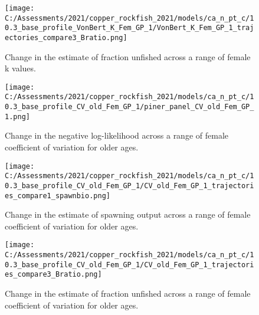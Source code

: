 \documentclass[11pt,
  english,
  a4paper,
]{article}
\begin{document}
\tagmcend\tagstructend


\begin{figure}
\centering
\texttt{[image: C:/Assessments/2021/copper\_rockfish\_2021/models/ca\_n\_pt\_c/10.3\_base\_profile\_VonBert\_K\_Fem\_GP\_1/VonBert\_K\_Fem\_GP\_1\_trajectories\_compare3\_Bratio.png]}
\caption{Change in the estimate of fraction unfished across a range of female k values.\label{fig:k-depl}}
\end{figure}

\tagmcend\tagstructend


\begin{figure}
\centering
\texttt{[image: C:/Assessments/2021/copper\_rockfish\_2021/models/ca\_n\_pt\_c/10.3\_base\_profile\_CV\_old\_Fem\_GP\_1/piner\_panel\_CV\_old\_Fem\_GP\_1.png]}
\caption{Change in the negative log-likelihood across a range of female coefficient of variation for older ages.\label{fig:cv-profile}}
\end{figure}

\tagmcend\tagstructend


\begin{figure}
\centering
\texttt{[image: C:/Assessments/2021/copper\_rockfish\_2021/models/ca\_n\_pt\_c/10.3\_base\_profile\_CV\_old\_Fem\_GP\_1/CV\_old\_Fem\_GP\_1\_trajectories\_compare1\_spawnbio.png]}
\caption{Change in the estimate of spawning output across a range of female coefficient of variation for older ages.\label{fig:cv-ssb}}
\end{figure}

\tagmcend\tagstructend


\begin{figure}
\centering
\texttt{[image: C:/Assessments/2021/copper\_rockfish\_2021/models/ca\_n\_pt\_c/10.3\_base\_profile\_CV\_old\_Fem\_GP\_1/CV\_old\_Fem\_GP\_1\_trajectories\_compare3\_Bratio.png]}
\caption{Change in the estimate of fraction unfished across a range of female coefficient of variation for older ages.\label{fig:cv-depl}}
\end{figure}
\end{document}
